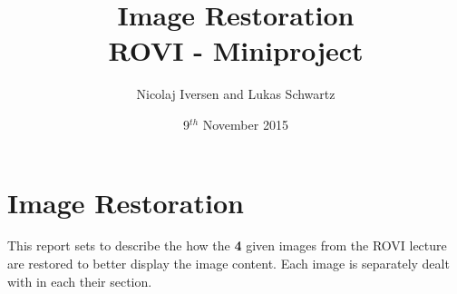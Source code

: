 \documentclass[12pt,a4paper,conference]{IEEEtran}
\begin{document}
\raggedbottom

\title{Image Restoration\\ \large{ROVI - Miniproject}}
\author{Nicolaj Iversen and Lukas Schwartz}
\date{9$^{th}$ November 2015}

\maketitle





\section{Image Restoration}
This report sets to describe the how the \textbf{4} given images from the ROVI lecture are restored to better display the image content.
Each image is separately dealt with in each their section.











\end{document}
